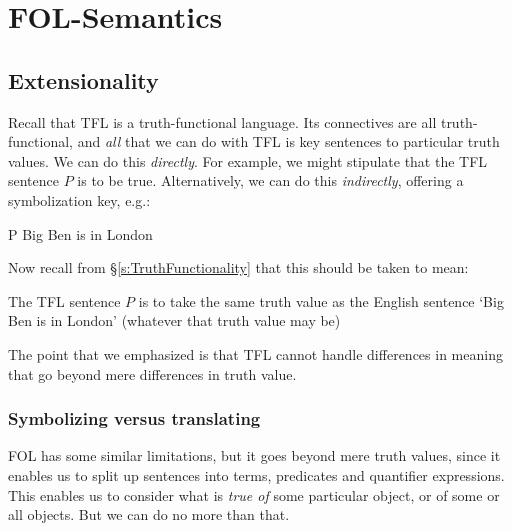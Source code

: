 \part{FOL-Semantics}
\label{ch.semantics}


\chapter{Extensionality}\label{s:Interpretations}

Recall that TFL is a truth-functional language. Its connectives are all truth-functional, and \emph{all} that we can do with TFL is key sentences to particular truth values. We can do this \emph{directly}. For example, we might stipulate that the TFL sentence $P$ is to be true. Alternatively, we can do this \emph{indirectly}, offering a symbolization key, e.g.:
	\begin{ekey}
		\item[P] Big Ben is in London
	\end{ekey}
Now recall from \S\ref{s:TruthFunctionality} that this should be taken to mean:
	\begin{ebullet}
		\item The TFL sentence $P$ is to take the same truth value as the English sentence `Big Ben is in London' (whatever that truth value may be)
	\end{ebullet}
The point that we emphasized is that TFL cannot handle differences in meaning that go beyond mere differences in truth value.


\section{Symbolizing versus translating}
FOL has some similar limitations, but it goes beyond mere truth values, since it enables us to split up sentences into terms, predicates and quantifier expressions. This enables us to consider what is \emph{true of} some particular object, or of some or all objects. But we can do no more than that.

